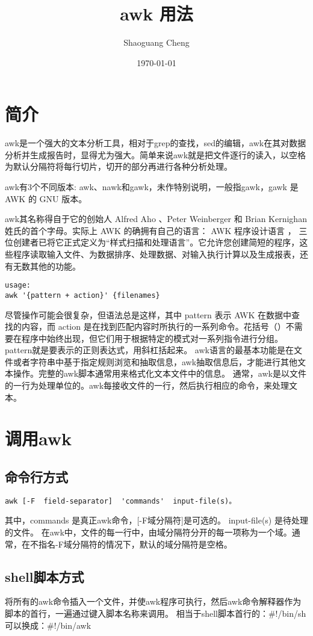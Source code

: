 \documentclass[12pt]{article}
\title{awk 用法}
\author{Shaoguang Cheng}
\date{\today}
\begin{document}
\maketitle

\section{简介}
awk是一个强大的文本分析工具，相对于grep的查找，sed的编辑，awk在其对数据分析并生成报告时，显得尤为强大。简单来说awk就是把文件逐行的读入，以空格为默认分隔符将每行切片，切开的部分再进行各种分析处理。


awk有3个不同版本: awk、nawk和gawk，未作特别说明，一般指gawk，gawk 是 AWK 的 GNU 版本。


awk其名称得自于它的创始人 Alfred Aho 、Peter Weinberger 和 Brian Kernighan 姓氏的首个字母。实际上 AWK 的确拥有自己的语言： AWK 程序设计语言 ， 三位创建者已将它正式定义为“样式扫描和处理语言”。它允许您创建简短的程序，这些程序读取输入文件、为数据排序、处理数据、对输入执行计算以及生成报表，还有无数其他的功能。
\begin{lstlisting} 
usage: 
awk '{pattern + action}' {filenames}
\end{lstlisting}
尽管操作可能会很复杂，但语法总是这样，其中 pattern 表示 AWK 在数据中查找的内容，而 action 是在找到匹配内容时所执行的一系列命令。花括号（{}）不需要在程序中始终出现，但它们用于根据特定的模式对一系列指令进行分组。 pattern就是要表示的正则表达式，用斜杠括起来。
%
awk语言的最基本功能是在文件或者字符串中基于指定规则浏览和抽取信息，awk抽取信息后，才能进行其他文本操作。完整的awk脚本通常用来格式化文本文件中的信息。
%
通常，awk是以文件的一行为处理单位的。awk每接收文件的一行，然后执行相应的命令，来处理文本。

 

\section{调用awk}
\subsection{命令行方式}
\begin{lstlisting} 
awk [-F  field-separator]  'commands'  input-file(s)。
\end{lstlisting}
其中，commands 是真正awk命令，[-F域分隔符]是可选的。 input-file(s) 是待处理的文件。
在awk中，文件的每一行中，由域分隔符分开的每一项称为一个域。通常，在不指名-F域分隔符的情况下，默认的域分隔符是空格。

\subsection{shell脚本方式}
将所有的awk命令插入一个文件，并使awk程序可执行，然后awk命令解释器作为脚本的首行，一遍通过键入脚本名称来调用。
相当于shell脚本首行的：\#!/bin/sh
可以换成：\#!/bin/awk
\end{document}
